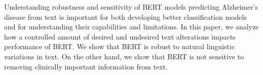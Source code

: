 Understanding robustness and sensitivity of BERT models predicting Alzheimer's disease from text is important for both developing better classification models and for understanding their capabilities and limitations. In this paper, we analyze how a controlled amount of desired and undesired text alterations impacts performance of BERT. We show that BERT is robust to natural linguistic variations in text. On the other hand, we show that BERT is not sensitive to removing clinically important information from text.
